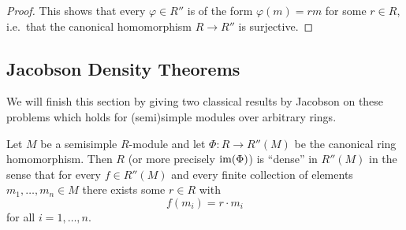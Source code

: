 \begin{proof}
  This shows that every $\varphi \in R''$ is of the form $\varphi(m) = rm$ for some $r \in R$, i.e.\ that the canonical homomorphism $R \to R''$ is surjective.
\end{proof}






\subsection{Jacobson Density Theorems}
\label{subsection: Jacobson Density Theorems}


\begin{fluff}
  We will finish this section by giving two classical results by Jacobson on these problems which holds for (semi)simple modules over arbitrary rings.
\end{fluff}


\begin{theorem}
  \label{theorem: first jacobson density theorem}
  Let $M$ be a semisimple $R$-module and let $\Phi \colon R \to R''(M)$ be the canonical ring homomorphism.
  Then $R$ (or more precisely $\operatorname{im}(\Phi)$) is \enquote{dense} in $R''(M)$ in the sense that for every $f \in R''(M)$ and every finite collection of elements $m_1, \dotsc, m_n \in M$ there exists some $r \in R$ with
  \[
      f(m_i)
    = r \cdot m_i
  \]
  for all $i = 1, \dotsc, n$.
\end{theorem}



